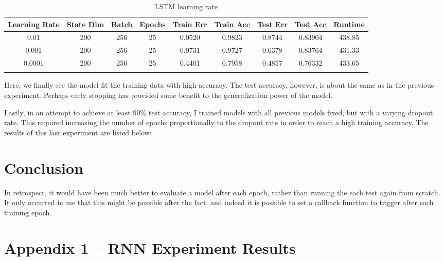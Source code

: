 \documentclass[letterpaper, 10pt]{article}
\begin{document}
\begin{longtable}{c | c | c | c | c | c | c | c | c}
Learning Rate & State Dim & Batch & Epochs & Train Err & Train Acc & Test Err & Test Acc & Runtime\\
\hline
\endhead
0.01 & 200 & 256 & 25 & 0.0520 & 0.9823 & 0.8744 & 0.83904 & 438.85 \\
0.001 & 200 & 256 & 25 & 0.0731 & 0.9727 & 0.6378 & 0.83764 & 431.33 \\
0.0001 & 200 & 256 & 25 & 0.4401 & 0.7958 & 0.4857 & 0.76332 & 433.65 \\
\caption{LSTM learning rate}
\label{tab:learningratelstm}
\end{longtable}

Here, we finally see the model fit the training data with high accuracy.
The test accuracy, however, is about the same as in the previous experiment. Perhaps
early stopping has provided some benefit to the generalization power of the model.

Lastly, in an attempt to achieve at least 90\% test accuracy, I trained
models with all previous models fixed, but with a varying dropout rate.
This required increasing the number of epochs proportionally to the dropout rate
in order to reach a high training accuracy. The results of this last experiment
are listed below:


\section{Conclusion}

In retrospect, it would have been much better to evaluate a model after each epoch,
rather than running the each test again from scratch. It only occurred to me that this
might be possible after the fact, and indeed it is possible to set a callback
function to trigger after each training epoch.

\newpage

\section{Appendix 1 -- RNN Experiment Results}
\end{document}
